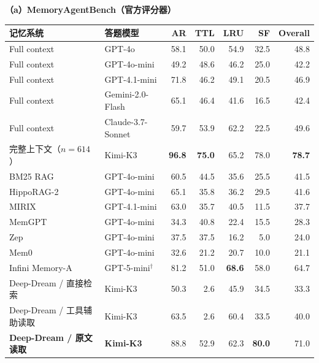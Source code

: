 \begin{table}[t]
\centering
\scriptsize
\setlength{\tabcolsep}{1.6pt}
\renewcommand{\arraystretch}{0.82}
{\footnotesize\textbf{（a）MemoryAgentBench（官方评分器）}}\\[1.5pt]
\begin{tabular*}{\textwidth}{@{\extracolsep{\fill}}>{\raggedright\arraybackslash}p{}>{\raggedright\arraybackslash}p{}rrrrr@{}}
\toprule
记忆系统 & 答题模型 & AR & TTL & LRU & SF & Overall \\
\midrule
Full context & GPT-4o & 58.1 & 50.0 & 54.9 & 32.5 & 48.8 \\
Full context & GPT-4o-mini & 49.2 & 48.6 & 46.2 & 25.0 & 42.2 \\
Full context & GPT-4.1-mini & 71.8 & 46.2 & 49.1 & 20.5 & 46.9 \\
Full context & Gemini-2.0-Flash & 65.1 & 46.4 & 41.6 & 16.5 & 42.4 \\
Full context & Claude-3.7-Sonnet & 59.7 & 53.9 & 62.2 & 22.5 & 49.6 \\
\rowcolor{blue!9}
完整上下文（$n{=}614$） & Kimi-K3 & \textbf{96.8} & \textbf{75.0} & 65.2 & 78.0 & \textbf{78.7} \\
\midrule
BM25 RAG & GPT-4o-mini & 60.5 & 44.5 & 35.6 & 25.5 & 41.5 \\
HippoRAG-2 & GPT-4o-mini & 65.1 & 35.8 & 36.2 & 29.5 & 41.6 \\
MIRIX & GPT-4.1-mini & 63.0 & 35.7 & 40.5 & 11.5 & 37.7 \\
MemGPT & GPT-4o-mini & 34.3 & 40.8 & 22.4 & 15.5 & 28.3 \\
Zep & GPT-4o-mini & 37.5 & 37.5 & 16.2 & 5.0 & 24.0 \\
Mem0 & GPT-4o-mini & 32.6 & 21.2 & 20.7 & 10.0 & 21.1 \\
\rowcolor{green!9}
Infini Memory-A & GPT-5-mini$^\dagger$ & 81.2 & 51.0 & \textbf{68.6} & 58.0 & 64.7 \\
\midrule
\rowcolor{blue!9}
Deep-Dream / 直接检索 & Kimi-K3 & 50.3 & 2.6 & 45.9 & 34.5 & 33.3 \\
\rowcolor{blue!9}
Deep-Dream / 工具辅助读取 & Kimi-K3 & 63.5 & 2.6 & 60.4 & 33.5 & 40.0 \\
\rowcolor{blue!9}
\textbf{Deep-Dream / 原文读取} & \textbf{Kimi-K3} & 88.8 & 52.9 & 62.3 & \textbf{80.0} & 71.0 \\
\bottomrule
\end{tabular*}


\end{table}
